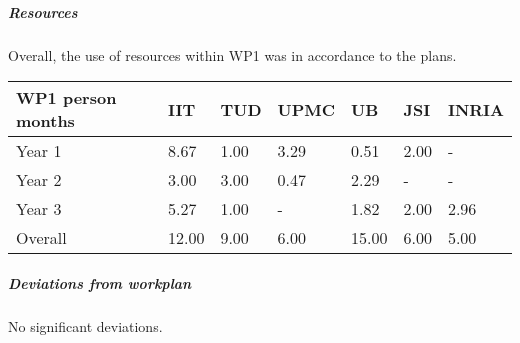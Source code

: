 

\subparagraph{Resources}
Overall, the use of resources within WP1 was in accordance to the plans. 

\begin{center}
  \begin{tabular}{|C{1.5cm}|C{1.5cm}|C{1.5cm}|C{2cm}|C{2cm}|C{2cm}|C{2cm}|}
    \hline \footnotesize \textbf{WP1 person months}& \footnotesize
    \textbf{IIT}&\footnotesize \textbf{TUD}&\footnotesize \textbf{UPMC}&
    \footnotesize \textbf{UB} &\footnotesize \textbf{JSI} & \footnotesize \textbf{INRIA}\\
    \hline \footnotesize Year 1 & 8.67 &1.00 & 3.29 & 0.51 & 2.00 & -\\
    \hline \footnotesize Year 2 & 3.00 & 3.00 & 0.47 & 2.29 & - & - \\
    \hline \footnotesize Year 3 & 5.27 & 1.00 & - & 1.82 & 2.00 & 2.96 \\
	\hline
    \hline \footnotesize Overall & 12.00 & 9.00 & 6.00 & 15.00 & 6.00 & 5.00 \\
    \hline
  \end{tabular}
\end{center}

\subparagraph{Deviations from workplan} 
No significant deviations. 
